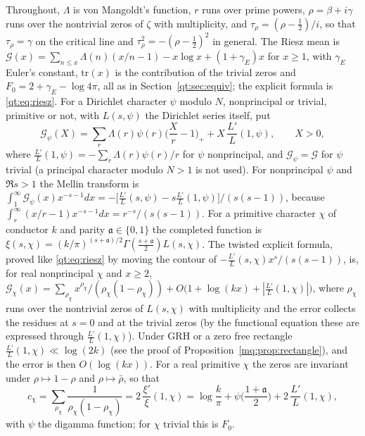 Throughout, $\Lambda$ is von Mangoldt's function, $r$ runs over prime powers, $\rho=\beta+i\gamma$ runs over the nontrivial zeros of $\zeta$ with multiplicity, and $\tau_\rho=(\rho-\frac12)/i$, so that $\tau_\rho=\gamma$ on the critical line and $\tau_\rho^2=-(\rho-\frac12)^2$ in general. The Riesz mean is $\mathcal G(x)=\sum_{n\le x}\Lambda(n)(x/n-1)-x\log x+(1+\gamma_E)x$ for $x\ge1$, with $\gamma_E$ Euler's constant, $\mathrm{tr}(x)$ is the contribution of the trivial zeros and $F_0=2+\gamma_E-\log4\pi$, all as in Section~\ref{qt:sec:equiv}; the explicit formula is \eqref{qt:eq:riesz}. For a Dirichlet character $\psi$ modulo $N$, nonprincipal or trivial, primitive or not, with $L(s,\psi)$ the Dirichlet series itself, put
\begin{equation}\label{mq:eq:Gpsi}
\mathcal G_\psi(X)=\sum_r\Lambda(r)\psi(r)\Big(\frac Xr-1\Big)_++X\,\frac{L'}{L}(1,\psi),\qquad X>0,
\end{equation}
where $\frac{L'}{L}(1,\psi)=-\sum_r\Lambda(r)\psi(r)/r$ for $\psi$ nonprincipal, and $\mathcal G_\psi=\mathcal G$ for $\psi$ trivial (a principal character modulo $N>1$ is not used). For nonprincipal $\psi$ and $\Re s>1$ the Mellin transform is $\int_1^\infty\mathcal G_\psi(x)x^{-s-1}dx=-\big[\frac{L'}{L}(s,\psi)-s\frac{L'}{L}(1,\psi)\big]/(s(s-1))$, because $\int_r^\infty(x/r-1)x^{-s-1}dx=r^{-s}/(s(s-1))$. For a primitive character $\chi$ of conductor $k$ and parity $\mathfrak a\in\{0,1\}$ the completed function is $\xi(s,\chi)=(k/\pi)^{(s+\mathfrak a)/2}\Gamma(\frac{s+\mathfrak a}2)L(s,\chi)$. The twisted explicit formula, proved like \eqref{qt:eq:riesz} by moving the contour of $-\frac{L'}{L}(s,\chi)x^s/(s(s-1))$, is, for real nonprincipal $\chi$ and $x\ge2$, $\mathcal G_\chi(x)=\sum_{\rho_\chi}x^{\rho_\chi}/(\rho_\chi(1-\rho_\chi))+O\big(1+\log(kx)+|\tfrac{L'}L(1,\chi)|\big)$, where $\rho_\chi$ runs over the nontrivial zeros of $L(s,\chi)$ with multiplicity and the error collects the residues at $s=0$ and at the trivial zeros (by the functional equation these are expressed through $\frac{L'}L(1,\chi)$). Under GRH or a zero free rectangle $\frac{L'}L(1,\chi)\ll\log(2k)$ (see the proof of Proposition~\ref{mq:prop:rectangle}), and the error is then $O(\log(kx))$. For a real primitive $\chi$ the zeros are invariant under $\rho\mapsto1-\rho$ and $\rho\mapsto\bar\rho$, so that
\begin{equation}\label{mq:eq:cchi}
c_\chi=\sum_{\rho_\chi}\frac{1}{\rho_\chi(1-\rho_\chi)}=2\,\frac{\xi'}{\xi}(1,\chi)=\log\frac k\pi+\psi\Big(\frac{1+\mathfrak a}2\Big)+2\,\frac{L'}{L}(1,\chi),
\end{equation}
with $\psi$ the digamma function; for $\chi$ trivial this is $F_0$.

